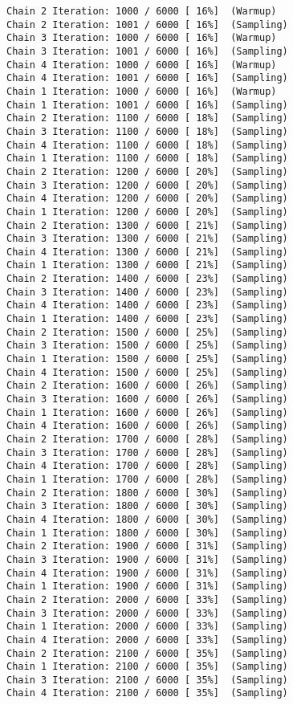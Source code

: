 \documentclass[
  letterpaper,
]{article}
\begin{document}
\begin{verbatim}
Chain 2 Iteration: 1000 / 6000 [ 16%]  (Warmup) 
Chain 2 Iteration: 1001 / 6000 [ 16%]  (Sampling) 
Chain 3 Iteration: 1000 / 6000 [ 16%]  (Warmup) 
Chain 3 Iteration: 1001 / 6000 [ 16%]  (Sampling) 
Chain 4 Iteration: 1000 / 6000 [ 16%]  (Warmup) 
Chain 4 Iteration: 1001 / 6000 [ 16%]  (Sampling) 
Chain 1 Iteration: 1000 / 6000 [ 16%]  (Warmup) 
Chain 1 Iteration: 1001 / 6000 [ 16%]  (Sampling) 
Chain 2 Iteration: 1100 / 6000 [ 18%]  (Sampling) 
Chain 3 Iteration: 1100 / 6000 [ 18%]  (Sampling) 
Chain 4 Iteration: 1100 / 6000 [ 18%]  (Sampling) 
Chain 1 Iteration: 1100 / 6000 [ 18%]  (Sampling) 
Chain 2 Iteration: 1200 / 6000 [ 20%]  (Sampling) 
Chain 3 Iteration: 1200 / 6000 [ 20%]  (Sampling) 
Chain 4 Iteration: 1200 / 6000 [ 20%]  (Sampling) 
Chain 1 Iteration: 1200 / 6000 [ 20%]  (Sampling) 
Chain 2 Iteration: 1300 / 6000 [ 21%]  (Sampling) 
Chain 3 Iteration: 1300 / 6000 [ 21%]  (Sampling) 
Chain 4 Iteration: 1300 / 6000 [ 21%]  (Sampling) 
Chain 1 Iteration: 1300 / 6000 [ 21%]  (Sampling) 
Chain 2 Iteration: 1400 / 6000 [ 23%]  (Sampling) 
Chain 3 Iteration: 1400 / 6000 [ 23%]  (Sampling) 
Chain 4 Iteration: 1400 / 6000 [ 23%]  (Sampling) 
Chain 1 Iteration: 1400 / 6000 [ 23%]  (Sampling) 
Chain 2 Iteration: 1500 / 6000 [ 25%]  (Sampling) 
Chain 3 Iteration: 1500 / 6000 [ 25%]  (Sampling) 
Chain 1 Iteration: 1500 / 6000 [ 25%]  (Sampling) 
Chain 4 Iteration: 1500 / 6000 [ 25%]  (Sampling) 
Chain 2 Iteration: 1600 / 6000 [ 26%]  (Sampling) 
Chain 3 Iteration: 1600 / 6000 [ 26%]  (Sampling) 
Chain 1 Iteration: 1600 / 6000 [ 26%]  (Sampling) 
Chain 4 Iteration: 1600 / 6000 [ 26%]  (Sampling) 
Chain 2 Iteration: 1700 / 6000 [ 28%]  (Sampling) 
Chain 3 Iteration: 1700 / 6000 [ 28%]  (Sampling) 
Chain 4 Iteration: 1700 / 6000 [ 28%]  (Sampling) 
Chain 1 Iteration: 1700 / 6000 [ 28%]  (Sampling) 
Chain 2 Iteration: 1800 / 6000 [ 30%]  (Sampling) 
Chain 3 Iteration: 1800 / 6000 [ 30%]  (Sampling) 
Chain 4 Iteration: 1800 / 6000 [ 30%]  (Sampling) 
Chain 1 Iteration: 1800 / 6000 [ 30%]  (Sampling) 
Chain 2 Iteration: 1900 / 6000 [ 31%]  (Sampling) 
Chain 3 Iteration: 1900 / 6000 [ 31%]  (Sampling) 
Chain 4 Iteration: 1900 / 6000 [ 31%]  (Sampling) 
Chain 1 Iteration: 1900 / 6000 [ 31%]  (Sampling) 
Chain 2 Iteration: 2000 / 6000 [ 33%]  (Sampling) 
Chain 3 Iteration: 2000 / 6000 [ 33%]  (Sampling) 
Chain 1 Iteration: 2000 / 6000 [ 33%]  (Sampling) 
Chain 4 Iteration: 2000 / 6000 [ 33%]  (Sampling) 
Chain 2 Iteration: 2100 / 6000 [ 35%]  (Sampling) 
Chain 1 Iteration: 2100 / 6000 [ 35%]  (Sampling) 
Chain 3 Iteration: 2100 / 6000 [ 35%]  (Sampling) 
Chain 4 Iteration: 2100 / 6000 [ 35%]  (Sampling) 

\end{verbatim}
\end{document}
